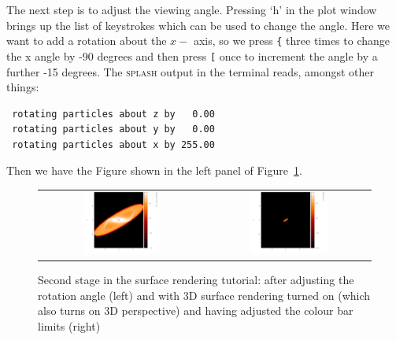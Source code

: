 \documentclass[a4paper,10pt]{article}
\newcommand{\splash}{\textsc{splash }}
\begin{document}
The next step is to adjust the viewing angle. Pressing `h' in the plot window brings up the list of keystrokes which can be used to change the angle. Here we want to add a rotation about the $x-$ axis, so we press \verb+{+ three times to change the x angle by -90 degrees and then press \verb+[+ once to increment the angle by a further -15 degrees. The \splash output in the terminal reads, amongst other things:
\begin{verbatim}
 rotating particles about z by   0.00
 rotating particles about y by   0.00
 rotating particles about x by 255.00
\end{verbatim}
Then we have the Figure shown in the left panel of Figure~\ref{fig:surfpart2}.
\begin{figure}[h]
\begin{center}
\begin{tabular}{cc}
\includegraphics[width=0.5\textwidth]{surfpart3.png} &
\includegraphics[width=0.5\textwidth]{surfpart4.png}
\end{tabular}
\caption{Second stage in the surface rendering tutorial: after adjusting the rotation angle (left) and with 3D surface rendering turned on (which also turns on 3D perspective) and having adjusted the colour bar limits (right)}
\label{fig:surfpart2}
\end{center}
\end{figure}
\end{document}
